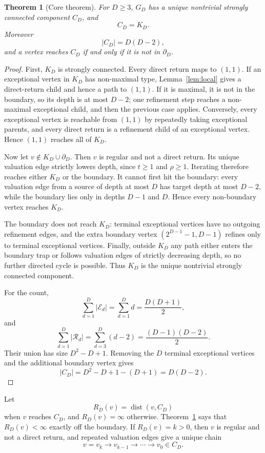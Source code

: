 \documentclass[11pt]{amsart}
\newtheorem{theorem}{Theorem}[section]
\theoremstyle{definition}
\theoremstyle{remark}
\newcommand{\Ecal}{\mathcal E}
\newcommand{\Rcal}{\mathcal R}
\newcommand{\bdD}{\partial_D}
\newcommand{\dist}{\operatorname{dist}}
\begin{document}
\begin{theorem}[Core theorem]\label{thm:core}
For $D\ge3$, $G_D$ has a unique nontrivial strongly connected component $C_D$, and
\[
C_D=K_D.
\]
Moreover
\[
|C_D|=D(D-2),
\]
and a vertex reaches $C_D$ if and only if it is not in $\bdD$.
\end{theorem}

\begin{proof}
First, $K_D$ is strongly connected.  Every direct return maps to $(1,1)$.  If an exceptional vertex in $K_D$ has non-maximal type, Lemma~\ref{lem:local} gives a direct-return child and hence a path to $(1,1)$.  If it is maximal, it is not in the boundary, so its depth is at most $D-2$; one refinement step reaches a non-maximal exceptional child, and then the previous case applies.  Conversely, every exceptional vertex is reachable from $(1,1)$ by repeatedly taking exceptional parents, and every direct return is a refinement child of an exceptional vertex.  Hence $(1,1)$ reaches all of $K_D$.

Now let $v\notin K_D\cup\bdD$.  Then $v$ is regular and not a direct return.  Its unique valuation edge strictly lowers depth, since $t\ge1$ and $\rho\ge1$.  Iterating therefore reaches either $K_D$ or the boundary.  It cannot first hit the boundary: every valuation edge from a source of depth at most $D$ has target depth at most $D-2$, while the boundary lies only in depths $D-1$ and $D$.  Hence every non-boundary vertex reaches $K_D$.

The boundary does not reach $K_D$: terminal exceptional vertices have no outgoing refinement edges, and the extra boundary vertex $(2^{D-1}-1,D-1)$ refines only to terminal exceptional vertices.  Finally, outside $K_D$ any path either enters the boundary trap or follows valuation edges of strictly decreasing depth, so no further directed cycle is possible.  Thus $K_D$ is the unique nontrivial strongly connected component.

For the count,
\[
\sum_{d=1}^D |\Ecal_d|=\sum_{d=1}^D d=\frac{D(D+1)}2,
\]
and
\[
\sum_{d=1}^D |\Rcal_d|=\sum_{d=3}^D(d-2)=\frac{(D-1)(D-2)}2.
\]
Their union has size $D^2-D+1$.  Removing the $D$ terminal exceptional vertices and the additional boundary vertex gives
\[
|C_D|=D^2-D+1-(D+1)=D(D-2).
\]
\end{proof}

Let
\[
R_D(v)=\dist(v,C_D)
\]
when $v$ reaches $C_D$, and $R_D(v)=\infty$ otherwise.  Theorem~\ref{thm:core} says that $R_D(v)<\infty$ exactly off the boundary.  If $R_D(v)=k>0$, then $v$ is regular and not a direct return, and repeated valuation edges give a unique chain
\[
v=v_k\to v_{k-1}\to\cdots\to v_0\in C_D.
\]
\end{document}
